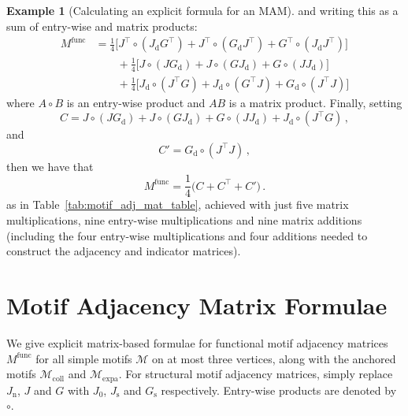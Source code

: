 \documentclass[12pt]{ociamthesis}
\theoremstyle{plain}
\theoremstyle{definition}
\newtheorem{example}{Example}[chapter]
\theoremstyle{remark}
\newcommand\ca[1]{\mathcal{#1}}
\begin{document}
\begin{example}[Calculating an explicit formula for an MAM]
  \endgroup
  and writing this as a sum of entry-wise and matrix products:
  \begin{align*}
    M^\textrm{func} &= \frac{1}{4} \Big[ J^\top \circ (J_\mathrm{d} G^\top) +
      J^\top \circ (G_\mathrm{d} J^\top) + G^\top \circ (J_\mathrm{d} J^\top)
    \Big] \\
    & \qquad + \frac{1}{4} \Big[ J \circ (J G_\mathrm{d}) + J \circ (G
    J_\mathrm{d}) + G \circ (J J_\mathrm{d}) \Big] \\
    & \qquad + \frac{1}{4} \Big[ J_\mathrm{d} \circ (J^\top G) + J_\mathrm{d}
    \circ (G^\top J) + G_\mathrm{d} \circ (J^\top J) \Big]
  \end{align*}
  where $A \circ B$ is an entry-wise product and $AB$ is a matrix product.
  Finally, setting
  $$C = J \circ (J G_\mathrm{d}) + J \circ (G J_\mathrm{d}) + G \circ (J
  J_\mathrm{d}) + J_\mathrm{d} \circ (J^\top G)\,, $$
  and
  $$ C' = G_\mathrm{d} \circ (J^\top J)\,, $$
  then we have that
  $$ M^\mathrm{func} = \frac{1}{4} \big(C + C^\top + C' \big)\,. $$
  as in Table~\ref{tab:motif_adj_mat_table}, achieved with just five matrix
  multiplications, nine entry-wise multiplications and nine matrix additions
  (including the four entry-wise multiplications and four additions needed to
  construct the adjacency and indicator matrices).
\end{example}
\clearpage{}
\clearpage{}
\chapter{Motif Adjacency Matrix Formulae}
\label{chap:appendix_matrices}

We give explicit matrix-based formulae for functional motif adjacency matrices
$M^\mathrm{func}$ for all simple motifs $\ca{M}$ on at most three vertices,
along with the anchored motifs $\ca{M}_\mathrm{coll}$ and
$\ca{M}_\mathrm{expa}$. For structural motif adjacency matrices, simply replace
$J_\mathrm{n}$, $J$ and $G$ with $J_0$, $J_\mathrm{s}$ and $G_\mathrm{s}$
respectively. Entry-wise products are denoted by $\circ$.
\end{document}

